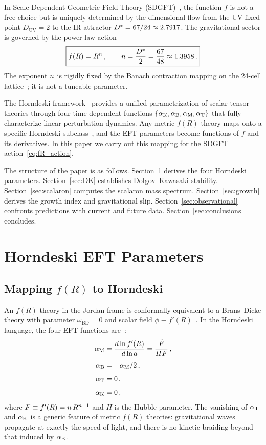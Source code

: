 \documentclass[amsmath,amssymb,aps,prd,twocolumn,superscriptaddress,nofootinbib]{revtex4-2}
\begin{document}
In Scale-Dependent Geometric Field Theory
(SDGFT)~\cite{Besemer_Paper01,Besemer_Paper04}, the function $f$ is
not a free choice but is uniquely determined by the dimensional flow
from the UV fixed point $D_{\mathrm{UV}} = 2$ to the IR attractor
$D^{*} = 67/24 \approx 2.7917$.  The gravitational sector is
governed by the power-law action
\begin{equation}
  \boxed{%
    f(R) = R^{\nfR}\,,\qquad \nfR = \frac{\Dstar}{2}
         = \frac{67}{48} \approx 1.3958\,.
  }
  \label{eq:fR_action}
\end{equation}
The exponent $n$ is rigidly fixed by the Banach contraction
mapping on the 24-cell lattice~\cite{Besemer_Paper04}; it is
not a tuneable parameter.

The Horndeski framework~\cite{Horndeski1974,Bellini2014}
provides a unified parametrization of scalar-tensor theories
through four time-dependent functions $\{\alpha_{\mathrm{K}}, \alpha_{\mathrm{B}}, \alpha_{\mathrm{M}}, \alpha_{\mathrm{T}}\}$
that fully characterize linear perturbation dynamics.  Any
metric $f(R)$ theory maps onto a specific Horndeski
subclass~\cite{DeFelice2010,Amendola2018}, and the EFT parameters
become functions of $f$ and its derivatives.  In this paper we
carry out this mapping for the SDGFT action~\eqref{eq:fR_action}.

The structure of the paper is as follows.
Section~\ref{sec:horndeski} derives the four Horndeski parameters.
Section~\ref{sec:DK} establishes Dolgov--Kawasaki stability.
Section~\ref{sec:scalaron} computes the scalaron mass spectrum.
Section~\ref{sec:growth} derives the growth index and gravitational
slip.  Section~\ref{sec:observational} confronts predictions with
current and future data.  Section~\ref{sec:conclusions} concludes.

\section{Horndeski EFT Parameters}
\label{sec:horndeski}

\subsection{Mapping $f(R)$ to Horndeski}

An $f(R)$ theory in the Jordan frame is conformally equivalent to a
Brans--Dicke theory with parameter $\omega_{\mathrm{BD}} = 0$ and
scalar field $\phi \equiv f'(R)$~\cite{Teyssandier1983}.  In the
Horndeski language, the four EFT functions are~\cite{Bellini2014,
Amendola2018}:
\begin{align}
  \alpha_{\mathrm{M}} &= \frac{d \ln f'(R)}{d \ln a}
       = \frac{\dot{F}}{HF}\,,
  \label{eq:aM_def} \\[4pt]
  \alpha_{\mathrm{B}} &= -\alpha_{\mathrm{M}}/2\,,
  \label{eq:aB_def} \\[4pt]
  \alpha_{\mathrm{T}} &= 0\,,
  \label{eq:aT_def} \\[4pt]
  \alpha_{\mathrm{K}} &= 0\,,
  \label{eq:aK_def}
\end{align}
where $F \equiv f'(R) = n\,R^{n-1}$ and $H$ is the Hubble
parameter.  The vanishing of $\alpha_{\mathrm{T}}$ and $\alpha_{\mathrm{K}}$ is a generic feature
of metric $f(R)$ theories: gravitational waves propagate at exactly
the speed of light, and there is no kinetic braiding beyond that
induced by $\alpha_{\mathrm{B}}$.
\end{document}
